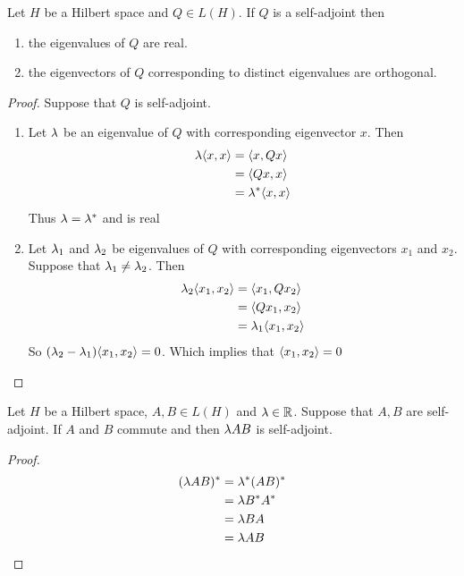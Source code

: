 \documentclass{book}
\begin{document}
\begin{ex} \lex{}
	Let $H$ be a Hilbert space and $Q \in L(H)$. If $Q$ is a self-adjoint then 
	\begin{enumerate}
		\item the eigenvalues of $Q$ are real.
		\item the eigenvectors of $Q$ corresponding to distinct eigenvalues are orthogonal.
	\end{enumerate}
\end{ex}

\begin{proof}
	Suppose that $Q$ is self-adjoint.
	\begin{enumerate}
		\item Let $\lambda$ be an eigenvalue of $Q$ with corresponding eigenvector $x$. Then 
		\begin{align*}
			\lambda \langle x , x\rangle
			&= \langle x , Q x\rangle \\
			&= \langle Q x , x\rangle \\
			&= \lambda^* \langle x , x\rangle
		\end{align*}
		Thus $\lambda = \lambda^*$ and is real
		
		\item Let $\lambda_1$ and $\lambda_2$ be eigenvalues of $Q$ with corresponding eigenvectors $x_1$ and $x_2$. Suppose that $\lambda_1 \neq \lambda_2$. Then 
		\begin{align*}
			\lambda_2 \langle x_1 ,  x_2\rangle
			&= \langle x_1 , Q x_2\rangle\\
			&= \langle Q x_1 ,  x_2\rangle\\
			&= \lambda_1 \langle x_1 ,  x_2\rangle
		\end{align*}
		So $(\lambda_2 - \lambda_1)\langle x_1 ,  x_2\rangle = 0$. Which implies that $\langle x_1 ,  x_2\rangle=0$
	\end{enumerate}
\end{proof}

\begin{ex} \lex{}
	Let $H$ be a Hilbert space, $A, B \in L(H)$ and $ \lambda \in \mathbb{R}$. Suppose that $A, B$ are self-adjoint. If $A$ and $B$ commute and then $\lambda AB$ is self-adjoint.
\end{ex}

\begin{proof}
	\begin{align*}
		(\lambda AB)^{*}
		&= \lambda^* (AB)^{*} \\
		&= \lambda B^{*} A^{*} \\
		&= \lambda B A \\
		&= \lambda AB
	\end{align*}
\end{proof}
\end{document}
